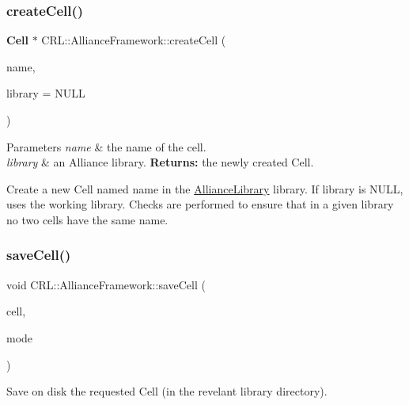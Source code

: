 \subsubsection{\texorpdfstring{create\+Cell()}{createCell()}}
{\footnotesize\ttfamily \textbf{ Cell} $\ast$ C\+R\+L\+::\+Alliance\+Framework\+::create\+Cell (\begin{DoxyParamCaption}\item[{const string \&}]{name,  }\item[{\hyperlink{classCRL_1_1AllianceLibrary}{Alliance\+Library} $\ast$}]{library = {\ttfamily NULL} }\end{DoxyParamCaption})}


\begin{DoxyParams}{Parameters}
{\em name} & the name of the cell. \\
\hline
{\em library} & an Alliance library. {\bfseries Returns\+:} the newly created Cell.\\
\hline
\end{DoxyParams}
Create a new Cell named {\ttfamily name} in the \hyperlink{classCRL_1_1AllianceLibrary}{Alliance\+Library} {\ttfamily library}. If {\ttfamily library} is {\ttfamily N\+U\+LL}, uses the working library. Checks are performed to ensure that in a given library no two cells have the same name. \mbox{\label{classCRL_1_1AllianceFramework_abb34a606c7cd21638b4439701a8dcef9}} 
\subsubsection{\texorpdfstring{save\+Cell()}{saveCell()}}
{\footnotesize\ttfamily void C\+R\+L\+::\+Alliance\+Framework\+::save\+Cell (\begin{DoxyParamCaption}\item[{\textbf{ Cell} $\ast$}]{cell,  }\item[{unsigned int}]{mode }\end{DoxyParamCaption})}

Save on disk the requested Cell (in the revelant library directory). \mbox{\label{classCRL_1_1AllianceFramework_a2e43b1928a05eea4b2dc1fe0757e4865}} 
